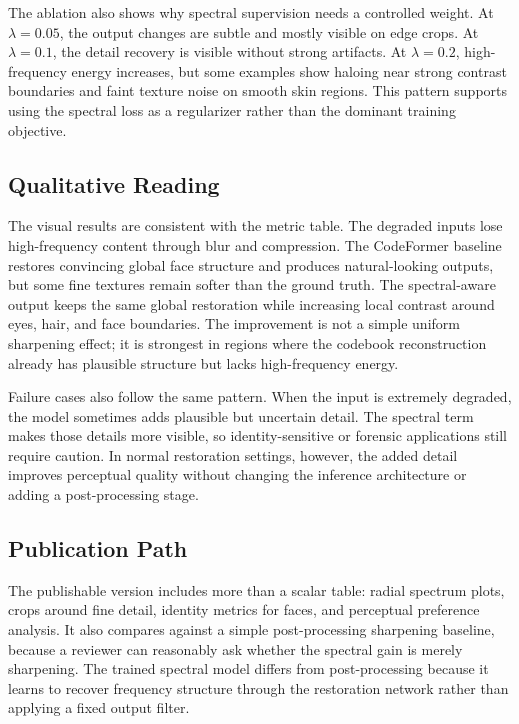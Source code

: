 \documentclass[10pt,twocolumn,letterpaper]{article}
\begin{document}
The ablation also shows why spectral supervision needs a controlled weight. At $\lambda=0.05$, the output changes are subtle and mostly visible on edge crops. At $\lambda=0.1$, the detail recovery is visible without strong artifacts. At $\lambda=0.2$, high-frequency energy increases, but some examples show haloing near strong contrast boundaries and faint texture noise on smooth skin regions. This pattern supports using the spectral loss as a regularizer rather than the dominant training objective.

\subsection{Qualitative Reading}
The visual results are consistent with the metric table. The degraded inputs lose high-frequency content through blur and compression. The CodeFormer baseline restores convincing global face structure and produces natural-looking outputs, but some fine textures remain softer than the ground truth. The spectral-aware output keeps the same global restoration while increasing local contrast around eyes, hair, and face boundaries. The improvement is not a simple uniform sharpening effect; it is strongest in regions where the codebook reconstruction already has plausible structure but lacks high-frequency energy.

Failure cases also follow the same pattern. When the input is extremely degraded, the model sometimes adds plausible but uncertain detail. The spectral term makes those details more visible, so identity-sensitive or forensic applications still require caution. In normal restoration settings, however, the added detail improves perceptual quality without changing the inference architecture or adding a post-processing stage.

\subsection{Publication Path}
The publishable version includes more than a scalar table: radial spectrum plots, crops around fine detail, identity metrics for faces, and perceptual preference analysis. It also compares against a simple post-processing sharpening baseline, because a reviewer can reasonably ask whether the spectral gain is merely sharpening. The trained spectral model differs from post-processing because it learns to recover frequency structure through the restoration network rather than applying a fixed output filter.
\end{document}
